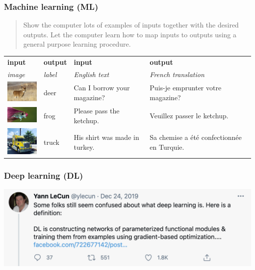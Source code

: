 \documentclass{beamer}
\begin{document}
    \begin{frame}
        \frametitle{Machine learning (ML)}

        \bigskip
        \begin{quote}
            Show the computer lots of examples of inputs together with the desired outputs.
            Let the computer learn how to map inputs to outputs using a general purpose learning procedure.
        \end{quote}

        \bigskip
        \begin{tabular}{ m{0.75in} m{0.5in} || m{1in} m{1.25in} }
            \textbf{input}&\textbf{output}&\textbf{input}&\textbf{output}\\[0.5em]
            \textit{image}&\textit{label}&\textit{English text}&\textit{French translation}\\[0.5em]
            \includegraphics[width=0.75in]{deer.jpg}&deer&\footnotesize Can I borrow your magazine?&\footnotesize Puis-je emprunter votre magazine?\\
            \includegraphics[width=0.75in]{frog.jpg}&frog&\footnotesize Please pass the ketchup.&\footnotesize Veuillez passer le ketchup.\\
            \includegraphics[width=0.75in]{truck.jpg}&truck&\footnotesize His shirt was made in turkey.&\footnotesize Sa chemise a \'et\'e confectionnée en Turquie.\\
        \end{tabular}
    \end{frame}
    
    

    

    \begin{frame}
        \frametitle{Deep learning (DL)}

        \begin{center}
        \includegraphics[scale=0.35]{lecundef.png}
        \end{center}
    \end{frame}
\end{document}
